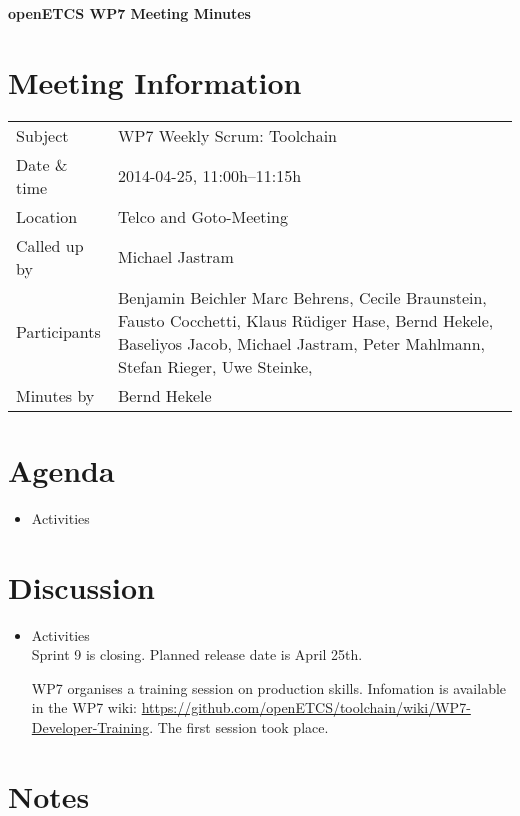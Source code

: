 \documentclass[a4paper, 11pt]{article}
\begin{document}
{\begin{center}\huge\bf openETCS WP7 Meeting Minutes\end{center}}
\section{Meeting Information}

\renewcommand{\arraystretch}{1.5}
\begin{supertabular}{m{.2\textwidth}m{.8\textwidth}}
Subject & WP7 Weekly Scrum: Toolchain\\
Date \& time & 2014-04-25, 11:00h--11:15h\\
Location & Telco and Goto-Meeting\\
Called up by & Michael Jastram\\
Participants &
Benjamin Beichler
Marc Behrens,
Cecile Braunstein,
Fausto Cocchetti,
Klaus R\"udiger Hase,
Bernd Hekele,
Baseliyos Jacob,
Michael Jastram,
Peter Mahlmann,
Stefan Rieger,
Uwe Steinke,
\\

Minutes by & Bernd Hekele\\

\end{supertabular}
\renewcommand{\arraystretch}{1.0}


\section{Agenda}
\begin{itemize}
\item Activities
\end{itemize}

\section{Discussion}

\begin{itemize}
\item Activities\\
Sprint 9 is closing. Planned release date is April 25th.

WP7 organises a training session on production skills. Infomation is available in the WP7 wiki: \url{https://github.com/openETCS/toolchain/wiki/WP7-Developer-Training}. The first session took place.

\end{itemize}

\section{Notes}
\end{document}
